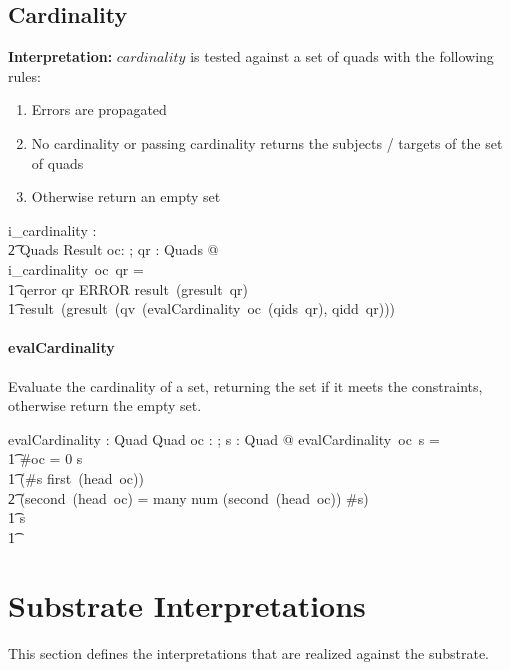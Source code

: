 \documentclass{article}
\begin{document}
\subsection{Cardinality}
\textbf{Interpretation:}
$cardinality$ is tested against a set of quads with the following rules:
\begin{enumerate}
\item Errors are propagated
\item No cardinality or passing cardinality returns  the subjects / targets of the set of quads
\item Otherwise return an empty set
\end{enumerate}
\begin{gendef}
   i\_cardinality :  \\
\t2 \optional[cardinality] \fun Quads \fun  Result
\where
   \forall oc: \optional[cardinality]; qr : Quads  @ \\
i\_cardinality~oc~qr = \\
\t1 \IF qerror \inv qr \in ERROR \THEN result~(gresult~qr) \\
\t1 \ELSE  result~(gresult~(qv~(evalCardinality~oc~(qids~qr), qidd~qr))) 
\end{gendef}

\paragraph{evalCardinality}
Evaluate the cardinality of a set, returning the set if it meets the constraints, otherwise return the empty set.

\begin{gendef}
   evalCardinality : \optional[cardinality] \fun \power Quad \fun \power Quad
\where
   \forall oc : \optional[cardinality]; s : \power Quad @ evalCardinality~oc~s = \\
\t1 \IF \#oc = 0 \THEN s \\
\t1 \ELSE \IF (\#s \geq first~(head~oc)) \land \\
\t2 (second~(head~oc) = many \lor num \inv (second~(head~oc)) \leq \#s) \\
\t1 \THEN s \\
\t1 \ELSE  \emptyset
\end{gendef}

\section{Substrate Interpretations}
\label{sect:substrate}
This section defines the interpretations that are realized against the substrate. 
\end{document}
